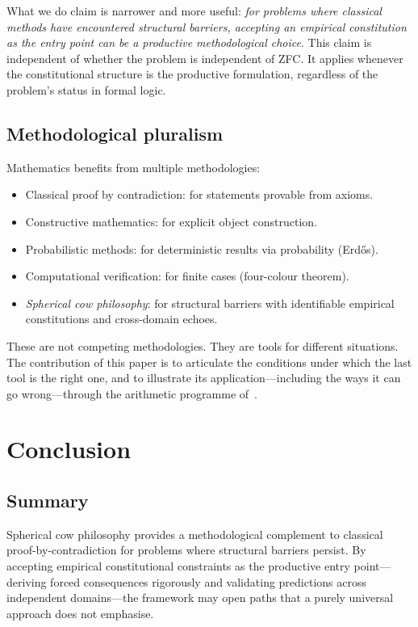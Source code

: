 \documentclass[12pt]{amsart}
\theoremstyle{plain}
\theoremstyle{definition}
\theoremstyle{remark}
\begin{document}
What we do claim is narrower and more useful: \emph{for problems where classical
methods have encountered structural barriers, accepting an empirical constitution
as the entry point can be a productive methodological choice}. This claim is
independent of whether the problem is independent of ZFC. It applies whenever
the constitutional structure is the productive formulation, regardless of the
problem's status in formal logic.

\subsection{Methodological pluralism}

Mathematics benefits from multiple methodologies:
\begin{itemize}
  \item Classical proof by contradiction: for statements provable from axioms.
  \item Constructive mathematics: for explicit object construction.
  \item Probabilistic methods: for deterministic results via probability
    (Erd\H{o}s).
  \item Computational verification: for finite cases (four-colour theorem).
  \item \emph{Spherical cow philosophy}: for structural barriers with
    identifiable empirical constitutions and cross-domain echoes.
\end{itemize}

These are not competing methodologies. They are tools for different situations.
The contribution of this paper is to articulate the conditions under which the
last tool is the right one, and to illustrate its application---including the
ways it can go wrong---through the arithmetic programme
of~\cite{WakilRamanujan,WakilEisenstein,WakilW3,WakilShannon}.

\section{Conclusion}

\subsection{Summary}

Spherical cow philosophy provides a methodological complement to classical
proof-by-contradiction for problems where structural barriers persist. By
accepting empirical constitutional constraints as the productive entry
point---deriving forced consequences rigorously and validating predictions
across independent domains---the framework may open paths that a purely
universal approach does not emphasise.
\end{document}
